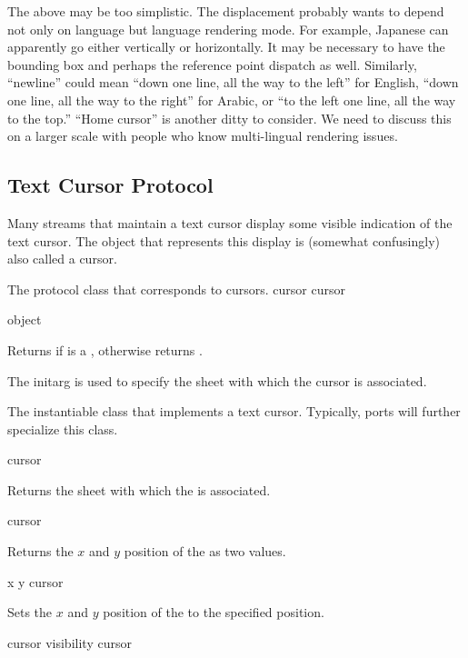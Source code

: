  {The above may be too simplistic. The displacement probably
wants to depend not only on language but language rendering mode.  For example,
Japanese can apparently go either vertically or horizontally.  It may be
necessary to have the bounding box and perhaps the reference point dispatch as
well.  Similarly, ``newline'' could mean ``down one line, all the way to the
left'' for English, ``down one line, all the way to the right'' for Arabic, or
``to the left one line, all the way to the top.''  ``Home cursor'' is another
ditty to consider.  We need to discuss this on a larger scale with people who
know multi-lingual rendering issues.}


\subsection {Text Cursor Protocol}

Many streams that maintain a text cursor display some visible indication of the
text cursor.  The object that represents this display is (somewhat confusingly)
also called a cursor.


The protocol class that corresponds to cursors.
 {cursor} {cursor}
\Mutable

 {object}

Returns  if  is a , otherwise returns
.


The  initarg is used to specify the sheet with which the cursor is
associated.


The instantiable class that implements a text cursor.  Typically, ports will
further specialize this class.

 {cursor}

Returns the sheet with which the   is associated.

 {cursor}

Returns the $x$ and $y$ position of the   as two
values.

 {x y cursor}

Sets the $x$ and $y$ position of the   to the specified
position.

 {cursor}
 {visibility cursor}

